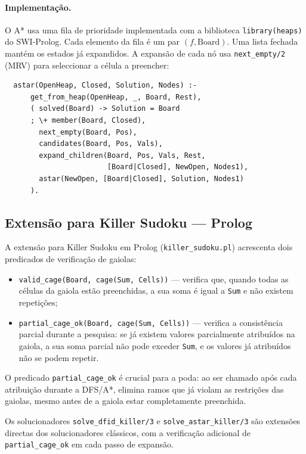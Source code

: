 \paragraph{Implementação.}
O A* usa uma fila de prioridade implementada com a biblioteca \texttt{library(heaps)} do SWI-Prolog. Cada elemento da fila é um par $(f, \text{Board})$. Uma lista fechada mantém os estados já expandidos. A expansão de cada nó usa \texttt{next\_empty/2} (MRV) para seleccionar a célula a preencher:
\begin{verbatim}
  astar(OpenHeap, Closed, Solution, Nodes) :-
      get_from_heap(OpenHeap, _, Board, Rest),
      ( solved(Board) -> Solution = Board
      ; \+ member(Board, Closed),
        next_empty(Board, Pos),
        candidates(Board, Pos, Vals),
        expand_children(Board, Pos, Vals, Rest,
                        [Board|Closed], NewOpen, Nodes1),
        astar(NewOpen, [Board|Closed], Solution, Nodes1)
      ).
\end{verbatim}

\subsection{Extensão para Killer Sudoku — Prolog}
\label{ssec:killer_prolog}

A extensão para Killer Sudoku em Prolog (\texttt{killer\_sudoku.pl}) acrescenta dois predicados de verificação de gaiolas:

\begin{itemize}
    \item \texttt{valid\_cage(Board, cage(Sum, Cells))} — verifica que, quando todas as células da gaiola estão preenchidas, a sua soma é igual a \texttt{Sum} e não existem repetições;
    \item \texttt{partial\_cage\_ok(Board, cage(Sum, Cells))} — verifica a consistência parcial durante a pesquisa: se já existem valores parcialmente atribuídos na gaiola, a sua soma parcial não pode exceder \texttt{Sum}, e os valores já atribuídos não se podem repetir.
\end{itemize}

O predicado \texttt{partial\_cage\_ok} é crucial para a poda: ao ser chamado após cada atribuição durante a DFS/A*, elimina ramos que já violam as restrições das gaiolas, mesmo antes de a gaiola estar completamente preenchida.

Os solucionadores \texttt{solve\_dfid\_killer/3} e \texttt{solve\_astar\_killer/3} são extensões directas dos solucionadores clássicos, com a verificação adicional de \texttt{partial\_cage\_ok} em cada passo de expansão.

